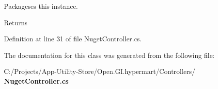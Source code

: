Packageses this instance. 

\begin{DoxyReturn}{Returns}

\end{DoxyReturn}


Definition at line 31 of file Nuget\+Controller.\+cs.



The documentation for this class was generated from the following file\+:\begin{DoxyCompactItemize}
\item 
C\+:/\+Projects/\+App-\/\+Utility-\/\+Store/\+Open.\+G\+I.\+hypermart/\+Controllers/\textbf{ Nuget\+Controller.\+cs}\end{DoxyCompactItemize}
